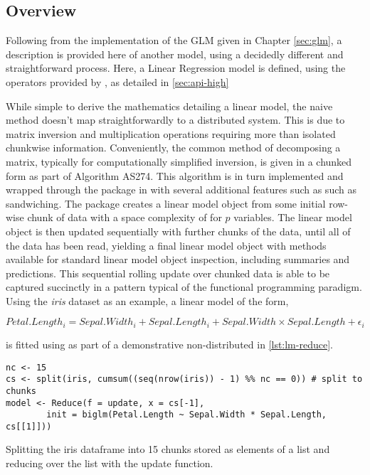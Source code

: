 \subsection{Overview}

Following from the implementation of the GLM given in Chapter \cref{sec:glm}, a description is provided here of another model, using a decidedly different and straightforward process.
Here, a Linear Regression model is defined, using the operators provided by \lsr, as detailed in \cref{sec:api-high}

While simple to derive the mathematics detailing a linear model, the naive method doesn't map straightforwardly to a distributed system.
This is due to matrix inversion and multiplication operations requiring more than isolated chunkwise information.
Conveniently, the common method of decomposing a matrix, typically for computationally simplified inversion, is given in a chunked form as part of Algorithm AS274\cite{miller1992as274}.
This algorithm is in turn implemented and wrapped through the  package in \R{} with several additional features such as such as sandwiching\cite{lumley2013biglm}.
The  package creates a linear model object from some initial row-wise chunk of data with a space complexity of  for $p$ variables.
The linear model object is then updated sequentially with further chunks of the data, until all of the data has been read, yielding a final linear model object with methods available for standard linear model object inspection, including summaries and predictions.
This sequential rolling update over chunked data is able to be captured succinctly in a  pattern typical of the functional programming paradigm.
Using the \textit{iris} dataset as an example, a linear model of the form, 

$$ Petal.Length_i = Sepal.Width_i + Sepal.Length_i + Sepal.Width \times Sepal.Length + \epsilon_i$$

is fitted using  as part of a demonstrative non-distributed  in \cref{lst:lm-reduce}.

\begin{listing}
	\begin{verbatim}
nc <- 15
cs <- split(iris, cumsum((seq(nrow(iris)) - 1) %% nc == 0)) # split to chunks
model <- Reduce(f = update, x = cs[-1],
		init = biglm(Petal.Length ~ Sepal.Width * Sepal.Length, cs[[1]]))
\end{verbatim}
\caption{Splitting the iris dataframe into 15 chunks stored as elements of a list and reducing over the list with the  update function.}
\label{lst:lm-reduce}
\end{listing}

